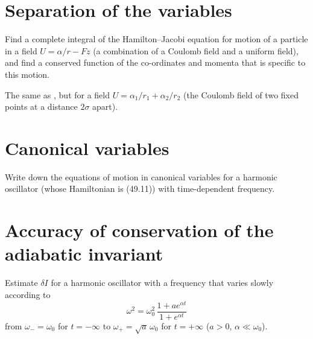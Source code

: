 \section{Separation of the variables}


\begin{problem}[title={Hamilton–Jacobi: Coulomb plus uniform field}]
{
Find a complete integral of the Hamilton--Jacobi equation for motion of a particle in a field $U = \alpha/r - Fz$ (a combination of a Coulomb field and a uniform field), and find a conserved function of the co-ordinates and momenta that is specific to this motion.
}
{}
{}
\end{problem}


\begin{problem}[title={Hamilton–Jacobi for two fixed Coulomb centres}]
{
The same as , but for a field $U = \alpha_1/r_1 + \alpha_2/r_2$ (the Coulomb field of two fixed points at a distance $2\sigma$ apart).
}
{}
{}
\end{problem}

\section{Canonical variables}


\begin{problem}[title={Oscillator with a time-dependent frequency}]
{
Write down the equations of motion in canonical variables for a harmonic oscillator (whose Hamiltonian is (49.11)) with time-dependent frequency.
}
{}
{}
\end{problem}

\section{Accuracy of conservation of the adiabatic invariant}


\begin{problem}[title={Adiabatic invariant change for smooth \texorplain{$\omega(t)$}{ω(t)}}]
{
Estimate $\delta I$ for a harmonic oscillator with a frequency that varies slowly according to
\begin{equation*}
    \omega^2 = \omega_0^2 \, \frac{1 + a e^{\alpha t}}{1 + e^{\alpha t}}
\end{equation*}
from $\omega_- = \omega_0$ for $t = -\infty$ to $\omega_+ = \sqrt{a}\,\omega_0$ for $t = +\infty$ ($a > 0$, $\alpha \ll \omega_0$).
}
{}
{}
\end{problem}

